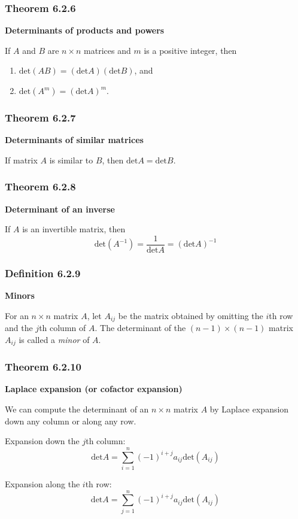 \documentclass{report}
\begin{document}
\subsubsection*{Theorem 6.2.6}
\par\noindent\textbf{Determinants of products and powers}
\par\noindent If $A$ and $B$ are $n\times{}n$ matrices and $m$ is a positive integer, then
\renewcommand{\labelenumi}{\textbf{\alph{enumi}.}}
\begin{enumerate}
\item $\textrm{det}(AB)=(\textrm{det}A)(\textrm{det}B)$, and
\item $\textrm{det}(A^{m})=(\textrm{det}A)^{m}$.
\end{enumerate}
\subsubsection*{Theorem 6.2.7}
\par\noindent\textbf{Determinants of similar matrices}
\par\noindent If matrix $A$ is similar to $B$, then $\textrm{det}A=\textrm{det}B$.
\subsubsection*{Theorem 6.2.8}
\par\noindent\textbf{Determinant of an inverse}
\par\noindent If $A$ is an invertible matrix, then
\[\textrm{det}(A^{-1})=\frac{1}{\textrm{det}A}=(\textrm{det}A)^{-1}\]
\subsubsection*{Definition 6.2.9}
\par\noindent\textbf{Minors}
\par\noindent For an $n\times{}n$ matrix $A$, let $A_{ij}$ be the matrix obtained by omitting the $i$th row and the $j$th column of $A$. The determinant of the $(n-1)\times{}(n-1)$ matrix $A_{ij}$ is called a \textit{minor} of $A$.
\subsubsection*{Theorem 6.2.10}
\par\noindent\textbf{Laplace expansion (or cofactor expansion)}
\par\noindent We can compute the determinant of an $n\times{}n$ matrix $A$ by Laplace expansion down any column or along any row.
\par Expansion down the $j$th column:
\[\textrm{det}A=\sum_{i=1}^{n}(-1)^{i+j}a_{ij}\textrm{det}(A_{ij})\]
\par Expansion along the $i$th row:
\[\textrm{det}A=\sum_{j=1}^{n}(-1)^{i+j}a_{ij}\textrm{det}(A_{ij})\]
\end{document}
